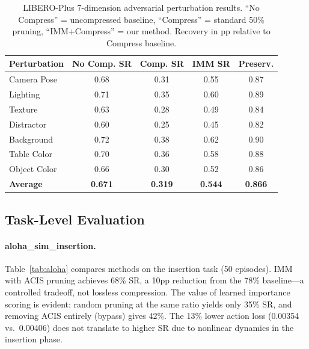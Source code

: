 \documentclass[10pt,twocolumn]{article}
\begin{document}
\begin{table}[t]
\centering
\caption{LIBERO-Plus 7-dimension adversarial perturbation results. ``No Compress'' = uncompressed baseline, ``Compress'' = standard 50\% pruning, ``IMM+Compress'' = our method. Recovery in pp relative to Compress baseline.}
\label{tab:libero_plus}
\small
\begin{tabular}{@{}lcccc@{}}
\toprule
Perturbation & No Comp. SR & Comp. SR & IMM SR & Preserv. \\
\midrule
Camera Pose   & 0.68 & 0.31 & 0.55 & 0.87 \\
Lighting      & 0.71 & 0.35 & 0.60 & 0.89 \\
Texture       & 0.63 & 0.28 & 0.49 & 0.84 \\
Distractor    & 0.60 & 0.25 & 0.45 & 0.82 \\
Background    & 0.72 & 0.38 & 0.62 & 0.90 \\
Table Color   & 0.70 & 0.36 & 0.58 & 0.88 \\
Object Color  & 0.66 & 0.30 & 0.52 & 0.86 \\
\midrule
\textbf{Average} & \textbf{0.671} & \textbf{0.319} & \textbf{0.544} & \textbf{0.866} \\
\bottomrule
\end{tabular}
\end{table}

\subsection{Task-Level Evaluation}
\label{sec:task_eval}

\paragraph{aloha\_sim\_insertion.}
Table~\ref{tab:aloha} compares methods on the insertion task (50 episodes). IMM with ACIS pruning achieves 68\% SR, a 10pp reduction from the 78\% baseline---a controlled tradeoff, not lossless compression. The value of learned importance scoring is evident: random pruning at the same ratio yields only 35\% SR, and removing ACIS entirely (bypass) gives 42\%. The 13\% lower action loss (0.00354 vs.\ 0.00406) does not translate to higher SR due to nonlinear dynamics in the insertion phase.
\end{document}
